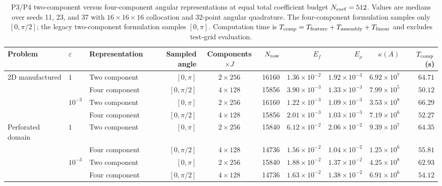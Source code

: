 \begin{table}[t]
\centering
\caption{P3/P4 two-component versus four-component angular representations at equal total coefficient budget $N_{\rm coef}=512$. Values are medians over seeds 11, 23, and 37 with $16\times16\times16$ collocation and 32-point angular quadrature. The four-component formulation samples only $[0,\pi/2]$; the legacy two-component formulation samples $[0,\pi]$. Computation time is $T_{\rm comp}=T_{\rm feature}+T_{\rm assembly}+T_{\rm linear}$ and excludes test-grid evaluation.}
\label{tab:p34-components}
\begin{tabular}{lllrcrrrrr}
\toprule
Problem & $\varepsilon$ & Representation & Sampled angle & Components$\times J$ & $N_{\rm row}$ & $E_f$ & $E_\rho$ & $\kappa(A)$ & $T_{\rm comp}$ (s)\\
\midrule
2D manufactured & $1$ & Two component & $[0,\pi]$ & $2\times256$ & 16160 & $1.36\times10^{-2}$ & $1.92\times10^{-3}$ & $6.92\times10^{7}$ & $64.71$\\
 &  & Four component & $[0,\pi/2]$ & $4\times128$ & 15856 & $3.90\times10^{-3}$ & $1.33\times10^{-3}$ & $7.99\times10^{5}$ & $50.12$\\
 & $10^{-3}$ & Two component & $[0,\pi]$ & $2\times256$ & 16160 & $1.22\times10^{-3}$ & $1.09\times10^{-3}$ & $3.53\times10^{8}$ & $66.29$\\
 &  & Four component & $[0,\pi/2]$ & $4\times128$ & 15856 & $2.01\times10^{-3}$ & $1.03\times10^{-3}$ & $7.19\times10^{6}$ & $52.27$\\
\midrule
Perforated domain & $1$ & Two component & $[0,\pi]$ & $2\times256$ & 15840 & $6.12\times10^{-2}$ & $2.06\times10^{-2}$ & $9.39\times10^{7}$ & $64.35$\\
 &  & Four component & $[0,\pi/2]$ & $4\times128$ & 14736 & $1.56\times10^{-2}$ & $1.04\times10^{-2}$ & $1.25\times10^{6}$ & $55.81$\\
 & $10^{-3}$ & Two component & $[0,\pi]$ & $2\times256$ & 15840 & $1.88\times10^{-2}$ & $1.37\times10^{-2}$ & $4.25\times10^{8}$ & $62.93$\\
 &  & Four component & $[0,\pi/2]$ & $4\times128$ & 14736 & $1.63\times10^{-2}$ & $1.38\times10^{-2}$ & $6.91\times10^{6}$ & $54.12$\\
\bottomrule
\end{tabular}
\end{table}

